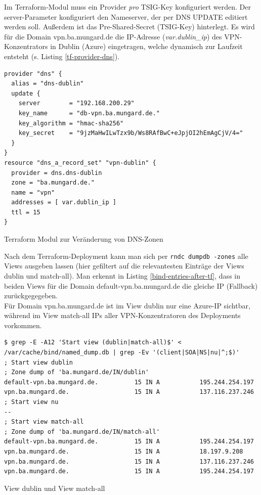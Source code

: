 Im Terraform-Modul muss ein Provider \textit{pro} \gls{TSIG}-Key konfiguriert werden. Der server-Parameter konfiguriert den Nameserver, der per \gls{DNS} UPDATE editiert werden soll. Außerdem ist das Pre-Shared-Secret (\gls{TSIG}-Key) hinterlegt. Es wird für die Domain vpn.ba.mungard.de die IP-Adresse (\textit{var.dublin\_ip}) des \gls{VPN-Konzentrator}s in Dublin (Azure) eingetragen, welche dynamisch zur Laufzeit entsteht (s. Listing \ref{tf-provider-dns}).
\begin{listing}[h]
\begin{verbatim}
provider "dns" {
  alias = "dns-dublin"
  update {
    server        = "192.168.200.29"
    key_name      = "db-vpn.ba.mungard.de."
    key_algorithm = "hmac-sha256"
    key_secret    = "9jzMaHwILwTzx9b/Ws8RAfBwC+eJpjOI2hEmAgCjV/4="
  }
}
resource "dns_a_record_set" "vpn-dublin" {
  provider = dns.dns-dublin
  zone = "ba.mungard.de."
  name = "vpn"
  addresses = [ var.dublin_ip ]
  ttl = 15
}
\end{verbatim}
\caption{Terraform Modul zur Veränderung von DNS-Zonen}
\label{tf-provider-dns}
\end{listing}\FloatBarrier
Nach dem Terraform-\gls{Deployment} kann man sich per \texttt{rndc dumpdb -zones} alle \gls{View}s ausgeben lassen (hier gefiltert auf die relevantesten Einträge der \gls{View}s \glqq dublin\grqq{} und \glqq match-all\grqq{}). Man erkennt in Listing \ref{bind-entries-after-tf}, dass in beiden \gls{View}s für die Domain default-vpn.ba.mungard.de die gleiche IP (\glqq Fallback\grqq{}) zurückgegegeben.\\
Für Domain vpn.ba.mungard.de ist im \gls{View} \glqq dublin\grqq{} nur eine Azure-IP sichtbar, während im \gls{View} \glqq match-all\grqq{} IPs aller \gls{VPN-Konzentrator}en des \gls{Deployment}s vorkommen.
\begin{listing}[h]
\begin{verbatim}
$ grep -E -A12 'Start view (dublin|match-all)$' < /var/cache/bind/named_dump.db | grep -Ev '(client|SOA|NS|nu|^;$)'
; Start view dublin
; Zone dump of 'ba.mungard.de/IN/dublin'
default-vpn.ba.mungard.de.          15 IN A           195.244.254.197
vpn.ba.mungard.de.                  15 IN A           137.116.237.246
; Start view nu
--
; Start view match-all
; Zone dump of 'ba.mungard.de/IN/match-all'
default-vpn.ba.mungard.de.          15 IN A           195.244.254.197
vpn.ba.mungard.de.                  15 IN A           18.197.9.208
vpn.ba.mungard.de.                  15 IN A           137.116.237.246
vpn.ba.mungard.de.                  15 IN A           195.244.254.197

\end{verbatim}
\caption{View \glqq dublin\grqq{} und View \glqq match-all\grqq{}}
\label{bind-entries-after-tf}
\end{listing}\FloatBarrier

